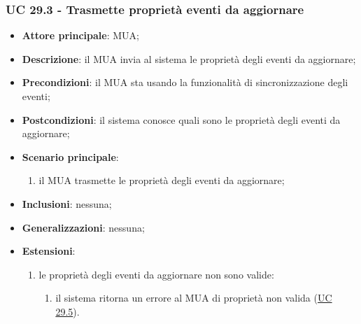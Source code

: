     \subsubsection{UC 29.3 - Trasmette proprietà eventi da aggiornare} \label{sec:UC29.3}
    \begin{itemize}
        \item \textbf{Attore principale}: MUA;
        \item \textbf{Descrizione}: il MUA invia al sistema le proprietà degli eventi da aggiornare;
        \item \textbf{Precondizioni}: il MUA sta usando la funzionalità di sincronizzazione degli eventi;
        \item \textbf{Postcondizioni}: il sistema conosce quali sono le proprietà degli eventi da aggiornare;
        \item \textbf{Scenario principale}:
            \begin{enumerate}
                \item il MUA trasmette le proprietà degli eventi da aggiornare;
            \end{enumerate}
        \item \textbf{Inclusioni}: nessuna;
        \item \textbf{Generalizzazioni}: nessuna;
        \item \textbf{Estensioni}:
            \begin{enumerate}[label=\alph*.]
                \item le proprietà degli eventi da aggiornare non sono valide:
                \begin{enumerate}[label=\arabic*.]
                    \item il sistema ritorna un errore al MUA di proprietà non valida (\hyperref[sec:UC29.5]{UC 29.5}).
                \end{enumerate}
            \end{enumerate}
    \end{itemize}


